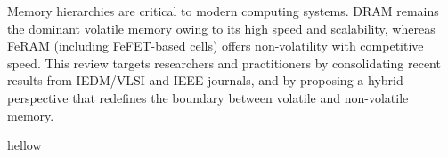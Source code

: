 
\noindent
Memory hierarchies are critical to modern computing systems. DRAM remains the dominant volatile memory owing to its high speed and scalability, whereas FeRAM (including FeFET-based cells) offers non-volatility with competitive speed. This review targets researchers and practitioners by consolidating recent results from IEDM/VLSI and IEEE journals, and by proposing a hybrid perspective that redefines the boundary between volatile and non-volatile memory.

hellow

